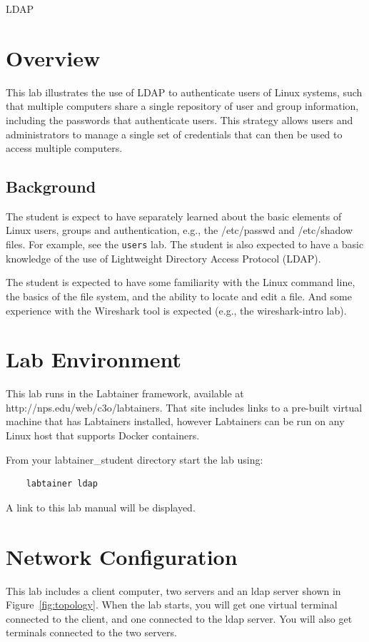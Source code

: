 


\begin{center}
{\LARGE LDAP}
\vspace{0.1in}\\
\end{center}

\copyrightnotice

\section{Overview}
This lab illustrates the use of LDAP to authenticate users of Linux systems,
such that multiple computers share a single repository of user and group information, including
the passwords that authenticate users.  This strategy allows users and administrators
to manage a single set of credentials that can then be used to access multiple computers. 

\subsection {Background}
The student is expect to have separately learned about the basic elements of Linux
users, groups and authentication, e.g., the /etc/passwd and /etc/shadow files. 
For example, see the {\tt users} lab. 
The student is also expected to have a basic knowledge of the use of Lightweight Directory
Access Protocol (LDAP).

The student is expected to have some familiarity with the Linux command line,
the basics of the file system, and the ability to locate and edit a file.  And some
experience with the Wireshark tool is expected (e.g., the wireshark-intro lab).

\section{Lab Environment}
This lab runs in the Labtainer framework,
available at http://nps.edu/web/c3o/labtainers.
That site includes links to a pre-built virtual machine
that has Labtainers installed, however Labtainers can
be run on any Linux host that supports Docker containers.

From your labtainer_student directory start the lab using:
\begin{verbatim}
    labtainer ldap
\end{verbatim}
\noindent A link to this lab manual will be displayed.  


\section{Network Configuration}
This lab includes a client computer, two servers and
an ldap server shown in Figure~\ref{fig:topology}.
When the lab starts, you will get one virtual terminal connected 
to the client, and one connected to the ldap server.  You will also
get terminals connected to the two servers.

